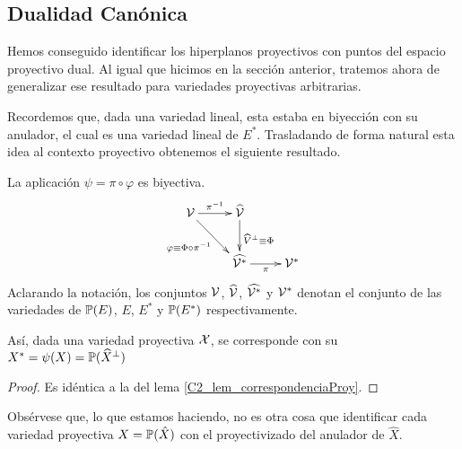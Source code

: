 \subsection{Dualidad Canónica}
Hemos conseguido identificar los hiperplanos proyectivos con puntos del espacio proyectivo dual. Al igual que hicimos en la sección anterior, tratemos ahora de generalizar ese resultado para variedades proyectivas arbitrarias.

Recordemos que, dada una variedad lineal, esta estaba en biyección con su anulador, el cual es una variedad lineal de $E^*$. Trasladando de forma natural esta idea al contexto proyectivo obtenemos el siguiente resultado.
\begin{lem}
	\label{C2_lem_correspondencia_proy_anulador}
	La aplicación $\psi=\pi\circ\varphi$ es biyectiva.
	\begin{equation*}
		\xymatrix{
			\mc{V} \ar[r]^{\pi^{-1}} \ar[dr]_{\varphi\equiv\Phi\circ\pi^{-1}} & \widehat{\mc{V}} \ar[d]^{\widehat{V}^\perp\equiv\Phi} & \\
			& \widehat{\mc{V}^*} \ar[r]_{\pi} & \mc{V}^* 
		}
	\end{equation*}
	Aclarando la notación, los conjuntos $\mathcal{V}$, $\widehat{\mathcal{V}}$, $\widehat{\mathcal{V}^*}$ y $\mathcal{V}^*$ denotan el conjunto de las variedades de $\mathbb{P}(E)$, $E$, $E^*$ y $\mathbb{P}(E^*)$ respectivamente.
	
	Así, dada una variedad proyectiva $\mathcal{X}$, se corresponde con su  $X^*=\psi(X)=\mathbb{P}(\widehat{X}^\perp)$
\end{lem}
\begin{proof}
	Es idéntica a la del lema \ref{C2_lem_correspondenciaProy}.
\end{proof}

Obsérvese que, lo que estamos haciendo, no es otra cosa que identificar cada variedad proyectiva $X=\mathbb{P}(\hat{X})$ con el proyectivizado del anulador de $\widehat{X}$.


